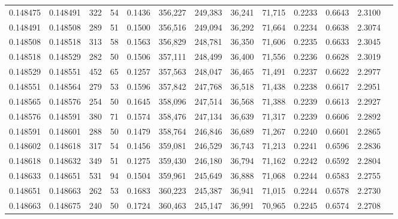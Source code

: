 \begin{tabular}{rrrrrrrrrrrrr}
0.148475 & 0.148491 &   322 &  54 &                                     0.1436 & 356,227 & 249,383 &  36,241 &  71,715 & 0.2233 & 0.6643 & 2.3100 \\
0.148491 & 0.148508 &   289 &  51 &                                     0.1500 & 356,516 & 249,094 &  36,292 &  71,664 & 0.2234 & 0.6638 & 2.3074 \\
0.148508 & 0.148518 &   313 &  58 &                                     0.1563 & 356,829 & 248,781 &  36,350 &  71,606 & 0.2235 & 0.6633 & 2.3045 \\
0.148518 & 0.148529 &   282 &  50 &                                     0.1506 & 357,111 & 248,499 &  36,400 &  71,556 & 0.2236 & 0.6628 & 2.3019 \\
0.148529 & 0.148551 &   452 &  65 &                                     0.1257 & 357,563 & 248,047 &  36,465 &  71,491 & 0.2237 & 0.6622 & 2.2977 \\
0.148551 & 0.148564 &   279 &  53 &                                     0.1596 & 357,842 & 247,768 &  36,518 &  71,438 & 0.2238 & 0.6617 & 2.2951 \\
0.148565 & 0.148576 &   254 &  50 &                                     0.1645 & 358,096 & 247,514 &  36,568 &  71,388 & 0.2239 & 0.6613 & 2.2927 \\
0.148576 & 0.148591 &   380 &  71 &                                     0.1574 & 358,476 & 247,134 &  36,639 &  71,317 & 0.2239 & 0.6606 & 2.2892 \\
0.148591 & 0.148601 &   288 &  50 &                                     0.1479 & 358,764 & 246,846 &  36,689 &  71,267 & 0.2240 & 0.6601 & 2.2865 \\
0.148602 & 0.148618 &   317 &  54 &                                     0.1456 & 359,081 & 246,529 &  36,743 &  71,213 & 0.2241 & 0.6596 & 2.2836 \\
0.148618 & 0.148632 &   349 &  51 &                                     0.1275 & 359,430 & 246,180 &  36,794 &  71,162 & 0.2242 & 0.6592 & 2.2804 \\
0.148633 & 0.148651 &   531 &  94 &                                     0.1504 & 359,961 & 245,649 &  36,888 &  71,068 & 0.2244 & 0.6583 & 2.2755 \\
0.148651 & 0.148663 &   262 &  53 &                                     0.1683 & 360,223 & 245,387 &  36,941 &  71,015 & 0.2244 & 0.6578 & 2.2730 \\
0.148663 & 0.148675 &   240 &  50 &                                     0.1724 & 360,463 & 245,147 &  36,991 &  70,965 & 0.2245 & 0.6574 & 2.2708 \\

\end{tabular}
